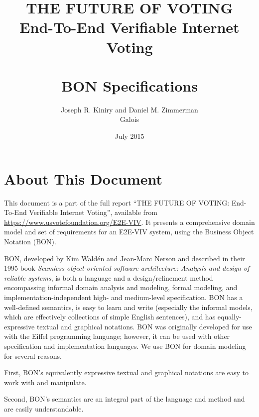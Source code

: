 \documentclass[]{report}
\title{\color{DarkGreen}\sffamily\bfseries THE FUTURE OF VOTING \\ \sffamily End-To-End
  Verifiable Internet Voting \\ \ \\ \sffamily BON Specifications}
\author{\color{DarkGreen}\sffamily Joseph R. Kiniry and Daniel M. Zimmerman \\
  \color{DarkGreen}\sffamily Galois}
\date{\color{DarkGreen}\sffamily 10 July 2015}
\begin{document}
\hypersetup{pageanchor=false}
\maketitle
\hypersetup{pageanchor=true}

\renewcommand{\contentsname}{\textcolor{DarkGreen}{CONTENTS}}
\renewcommand{\cfttoctitlefont}{\Huge\bfseries\sffamily}
\renewcommand{\cftchapfont}{\bfseries\sffamily}
\renewcommand{\cftsecfont}{\sffamily}
\renewcommand{\cftsubsecfont}{\sffamily}
\renewcommand{\cftsubsubsecfont}{\sffamily}
\renewcommand{\cftfigfont}{\sffamily}
\renewcommand{\cfttabfont}{\sffamily}
\renewcommand{\cftchappagefont}{\bfseries\sffamily}
\renewcommand{\cftsecpagefont}{ \sffamily}
\renewcommand{\cftsubsecpagefont}{ \sffamily}  
\renewcommand{\cftsubsubsecpagefont}{ \sffamily}
\renewcommand{\cftfigpagefont}{ \sffamily}
\renewcommand{\cfttabpagefont}{ \sffamily}
 
\tableofcontents

\chapter*{About This Document}

This document is a part of the full report ``THE FUTURE OF VOTING:
End-To-End Verifiable Internet Voting'', available from
\url{https://www.usvotefoundation.org/E2E-VIV}. It presents a
comprehensive domain model and set of requirements for an E2E-VIV
system, using the Business Object Notation (BON). 

BON, developed by Kim Wald\'{e}n and Jean-Marc Nerson and described in
their 1995 book \emph{Seamless object-oriented software architecture:
  Analysis and design of reliable systems}, is both a language and a
design/refinement method encompassing informal domain analysis and
modeling, formal modeling, and implementation-independent high- and
medium-level specification. BON has a well-defined semantics, is easy
to learn and write (especially the informal models, which are
effectively collections of simple English sentences), and has
equally-expressive textual and graphical notations. BON was originally
developed for use with the Eiffel programming language; however, it
can be used with other specification and implementation languages. We
use BON for domain modeling for several reasons.

First, BON's equivalently expressive textual and graphical notations
are easy to work with and manipulate.

Second, BON's semantics are an integral part of the language and
method and are easily understandable. 
\end{document}
